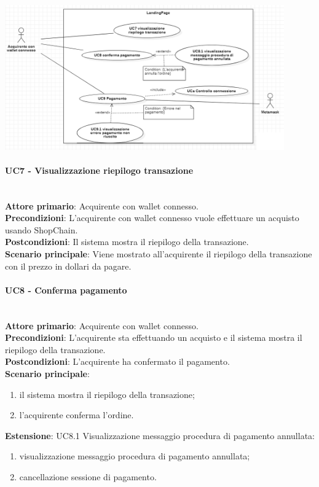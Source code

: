 \documentclass[a4paper, 12pt]{article}
\begin{document}
\includegraphics[width=0.9\textwidth]{UC_LP2}

\paragraph{UC7 - Visualizzazione riepilogo transazione}\\
\textbf{Attore primario}: Acquirente con wallet connesso.\\
\textbf{Precondizioni}: L'acquirente con wallet connesso vuole effettuare un acquisto usando ShopChain.\\
\textbf{Postcondizioni}: Il sistema mostra il riepilogo della transazione.\\
\textbf{Scenario principale}:
Viene mostrato all'acquirente il riepilogo della transazione con il prezzo in dollari da pagare.

\paragraph{UC8 - Conferma pagamento}\\
\textbf{Attore primario}: Acquirente con wallet connesso.\\
\textbf{Precondizioni}: L'acquirente sta effettuando un acquisto e il sistema mostra il riepilogo della transazione.\\
\textbf{Postcondizioni}: L'acquirente ha confermato il pagamento.\\
\textbf{Scenario principale}:
\begin{enumerate}
    \item il sistema mostra il riepilogo della transazione;
    \item l'acquirente conferma l'ordine.
\end{enumerate}
\textbf{Estensione}:
UC8.1 Visualizzazione messaggio procedura di pagamento annullata:
\begin{enumerate}
    \item visualizzazione messaggio procedura di pagamento annullata;
    \item cancellazione sessione di pagamento.
\end{enumerate}
\end{document}
